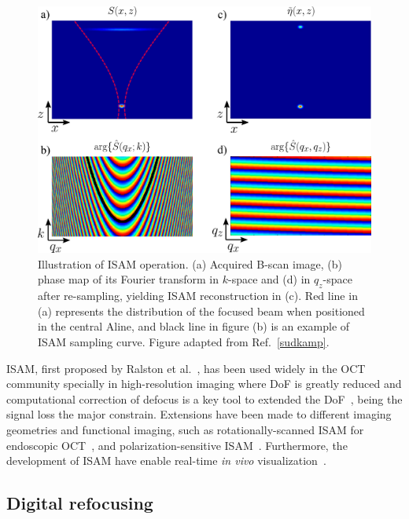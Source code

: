 \begin{figure}[htb!]
    \centering
    \includegraphics[width=.75\textwidth]{Figures/TheoreticalBasis/ISAM.pdf}
    \caption[Illustration of ISAM operation.]{Illustration of ISAM operation. (a) Acquired B-scan image, (b) phase map of its Fourier transform in $k$-space and (d) in $q_z$-space after re-sampling, yielding ISAM reconstruction in (c). Red line in (a) represents the distribution of the focused beam when positioned in the central Aline, and black line in figure (b) is an example of ISAM sampling curve. Figure adapted from Ref.~\ref{sudkamp}.}
    \label{fig:ISAM}
\end{figure}
\fi

ISAM, first proposed by Ralston et al.~\cite{Ralston2006_Interferometric}, has been used widely in the OCT community specially in high-resolution imaging where DoF is greatly reduced and computational correction of defocus is a key tool to extended the DoF~\cite{Liu2014_Computed, Boppart2015_Computational, Yi2019_Structure, Zysk2015_Intraoperative}, being the signal loss the major constrain. Extensions have been made to different imaging geometries and functional imaging, such as rotationally-scanned ISAM for endoscopic OCT~\cite{Marks2006_Inverse-1, Marks2006_Inverse}, and polarization-sensitive ISAM~\cite{Davis2007_Polarimetric}. Furthermore, the development of ISAM have enable real-time \textit{in vivo} visualization~\cite{Ralston2008_Realtime, Ralston2013_Interferometric, St.Marie2013_Robust}. 

\subsection{Digital refocusing}

